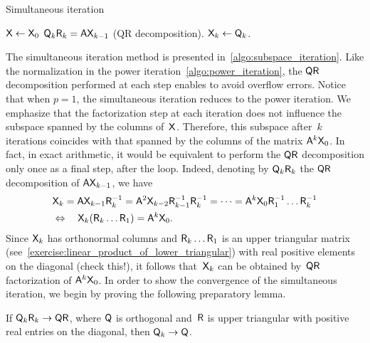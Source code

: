 \begin{algorithm}[ht!]
\caption{Simultaneous iteration}%
\label{algo:subspace_iteration}%
\begin{algorithmic}
\State $\mathsf X \gets \mathsf X_0$
    \State $\mathsf Q_k \mathsf R_k = \mathsf A \mathsf X_{k-1}$ (QR decomposition).
    \State $\mathsf X_k \gets \mathsf Q_k$.
\EndFor
\end{algorithmic}
\end{algorithm}
The simultaneous iteration method is presented in~\cref{algo:subspace_iteration}.
Like the normalization in the power iteration~\cref{algo:power_iteration},
the $\mathsf Q \mathsf R$ decomposition performed at each step enables to avoid overflow errors.
Notice that when $p = 1$,
the simultaneous iteration reduces to the power iteration.
We emphasize that
the factorization step at each iteration does not influence the subspace spanned by the columns of~$\mathsf X$.
Therefore, this subspace after~$k$ iterations
coincides with that spanned by the columns of the matrix $\mathsf A^k \mathsf X_0$.
In fact, in exact arithmetic, it would be equivalent to perform the $\mathsf Q \mathsf R$ decomposition only once as a final step,
after the  loop.
Indeed, denoting by $\mathsf Q_k \mathsf R_k$ the $\mathsf Q \mathsf R$ decomposition of $\mathsf A \mathsf X_{k-1}$,
we have
\begin{align*}
    &\mathsf X_k = \mathsf A \mathsf X_{k-1} \mathsf R_k^{-1} = \mathsf A^2 \mathsf X_{k-2} \mathsf R_{k-1}^{-1} \mathsf R_k^{-1} = \dotsb
    = \mathsf A^k \mathsf X_0 \mathsf R_1^{-1} \dotsc \mathsf R_k^{-1} \\
    &\Leftrightarrow \quad \mathsf X_k (\mathsf R_k \dotsc \mathsf R_1) = \mathsf A^k \mathsf X_0.
\end{align*}
Since $\mathsf X_k$ has orthonormal columns and $\mathsf R_k \dotsc \mathsf R_1$ is an upper triangular matrix (see~\cref{exercise:linear_product_of_lower_triangular})
with real positive elements on the diagonal (check this!),
it follows that~$\mathsf X_k$ can be obtained by~$\mathsf Q \mathsf R$ factorization of $\mathsf A^k \mathsf X_0$.
In order to show the convergence of the simultaneous iteration,
we begin by proving the following preparatory lemma.
\begin{lemma}
    \label{lemma:continuity_qr}
    If $\mathsf Q_k \mathsf R_k \to \mathsf Q \mathsf R$,
    where $\mathsf Q$ is orthogonal and~$\mathsf R$ is upper triangular with positive real entries on the diagonal,
    then $\mathsf Q_k \to \mathsf Q$.
\end{lemma}
